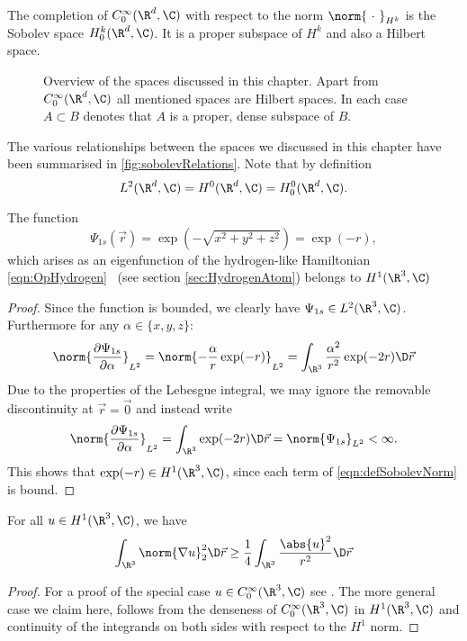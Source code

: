 \begin{defn}
	The completion of $C^\infty_0(\R^d, \C)$
	with respect to the norm $\norm{~\cdot~}_{H^k}$
	is the Sobolev space $H^k_0(\R^d, \C)$.
	It is a proper subspace of $H^k$ and also a Hilbert space.
\end{defn}

\begin{figure}
	\centering
	\caption{Overview of the spaces discussed in this chapter.
		Apart from $C^\infty_0(\R^d, \C)$ all mentioned spaces are Hilbert spaces.
		In each case $A \subset B$ denotes that $A$ is a proper, dense
		subspace of $B$.}
	\label{fig:sobolevRelations}
\end{figure}
The various relationships between the spaces we discussed
in this chapter have been summarised in \fig \vref{fig:sobolevRelations}.
Note that by definition
\[ L^2(\R^d, \C) = H^0(\R^d, \C) = H^0_0(\R^d, \C). \]

\begin{exmp}
	\label{exmp:H1sH1}
	The function
	\[ \Psi_{1s}(\vec{r}) = \exp\left(- \sqrt{x^2 + y^2 + z^2} \right) = \exp(-r), \]
	which arises as an eigenfunction
	of the hydrogen-like Hamiltonian \eqref{eqn:OpHydrogen}%
	~(see section \vref{sec:HydrogenAtom})
	belongs to $H^1(\R^3, \C)$
	\begin{proof}
	Since the function is bounded, we clearly have $\Psi_{1s} \in L^2(\R^3, \C)$.
	Furthermore for any $\alpha \in \{x, y, z\}$:
	\begin{equation}
		\norm{ \frac{\partial \Psi_{1s}}{\partial \alpha} }_{L^2}
		= \norm{ - \frac{\alpha}{r} \exp(-r) }_{L^2}
		= \int_{\R^3} \frac{\alpha^2}{r^2} \exp(-2r) \D\vec{r}
		\label{eqn:ProofH1sH1}
	\end{equation}
	Due to the properties of the Lebesgue integral,
	we may ignore the removable discontinuity at $\vec{r} = \vec{0}$
	and instead write
	\[ \norm{ \frac{\partial \Psi_{1s}}{\partial \alpha} }_{L^2}
		= \int_{\R^3} \exp(-2r) \D\vec{r} = \norm{\Psi_{1s}}_{L^2} < \infty. \]
	This shows that $\exp(-r) \in H^1(\R^3, \C)$,
	since each term of \eqref{eqn:defSobolevNorm} is bound.
	\end{proof}
\end{exmp}

\begin{prop}
	\label{prop:Hardy}
	For all $u \in H^1(\R^3, \C)$, we have
	\[ \int_{\R^3} \norm{\nabla u}_2^2 \D\vec{r}
		\geq \frac{1}{4} \int_{\R^3} \frac{\abs{u}^2}{r^2} \D\vec{r} \]
	\begin{proof}
		For a proof of the special case $u \in C_0^\infty(\R^3, \C)$
		see \cite[p. 30]{Helffer2013}.
		The more general case we claim here,
		follows from the denseness of $C_0^\infty(\R^3, \C)$ in $H^1(\R^3, \C)$
		and continuity of the integrands on both sides
		with respect to the $H^1$ norm.
	\end{proof}
\end{prop}

